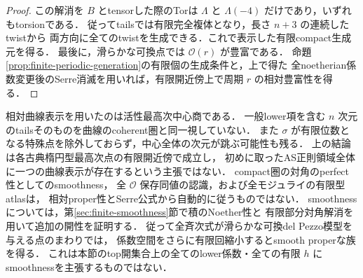 \begin{proof}
この解消を $B$ とtensorした際のTorは
$\Lambda$ と $\Lambda(-4)$ だけであり，いずれもtorsionである．
従ってtailsでは有限完全複体となり，長さ $n+3$ の連続したtwistから
両方向に全てのtwistを生成できる．これで表示した有限compact生成元を得る．
最後に，滑らかな可換点では $\mathcal O(r)$ が豊富である．
命題\ref{prop:finite-periodic-generation}の有限個の生成条件と，上で得た
全noetherian係数変更後のSerre消滅を用いれば，有限開近傍上で周期 $r$ の相対豊富性を得る．
\end{proof}

\begin{remark}[適用範囲]
\label{rem:elliptic-relative-scope}
相対曲線表示を用いたのは活性最高次中心商である．
一般lower項を含む $n$ 次元のtailsそのものを曲線のcoherent圏と同一視していない．
また $\sigma$ が有限位数となる特殊点を除外しておらず，中心全体の次元が跳ぶ可能性も残る．
上の結論は各古典楕円型最高次点の有限開近傍で成立し，
初めに取ったAS正則領域全体に一つの曲線表示が存在するという主張ではない．
compact圏の対角のperfect性としてのsmoothness，
全 $\mathcal O$ 保存同値の認識，および全モジュライの有限型atlasは，
相対proper性とSerre公式から自動的に従うものではない．
smoothnessについては，第\ref{sec:finite-smoothness}節で積のNoether性と
有限部分対角解消を用いて追加の開性を証明する．
従って全斉次式が滑らかな可換del Pezzo模型を与える点のまわりでは，
係数空間をさらに有限回縮小するとsmooth properな族を得る．
これは本節のtop開集合上の全てのlower係数・全ての有限 $h$ に
smoothnessを主張するものではない．
\end{remark}
